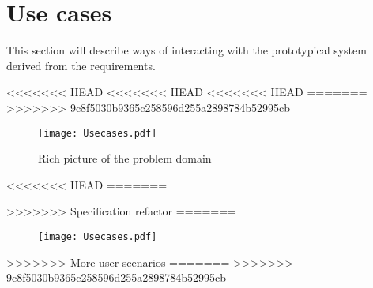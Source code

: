 \section{Use cases}\label{sec:usecases}

This section will describe ways of interacting with the prototypical system derived from the requirements.

<<<<<<< HEAD
<<<<<<< HEAD
<<<<<<< HEAD
=======
>>>>>>> 9c8f5030b9365c258596d255a2898784b52995cb
\begin{figure}
 \centering 
 \texttt{[image: Usecases.pdf]}
 \caption{Rich picture of the problem domain}
\end{figure}
<<<<<<< HEAD
=======

>>>>>>> Specification refactor
=======
\begin{figure}
 \centering 
 \texttt{[image: Usecases.pdf]}
\end{figure}
>>>>>>> More user scenarios
=======
>>>>>>> 9c8f5030b9365c258596d255a2898784b52995cb

